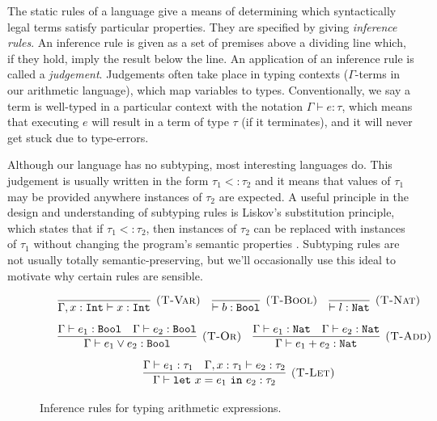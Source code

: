 The static rules of a language give a means of determining which syntactically legal terms satisfy particular properties. They are specified by giving \textit{inference rules}. An inference rule is given as a set of premises above a dividing line which, if they hold, imply the result below the line. An application of an inference rule is called a \textit{judgement}. Judgements often take place in typing contexts ($\Gamma$-terms in our arithmetic language), which map variables to types. Conventionally, we say a term is well-typed in a particular context with the notation $\Gamma \vdash e: \tau$, which means that executing $e$ will result in a term of type $\tau$ (if it terminates), and it will never get stuck due to type-errors.

Although our language has no subtyping, most interesting languages do. This judgement is usually written in the form $\tau_1 <: \tau_2$ and it means that values of $\tau_1$ may be provided anywhere instances of $\tau_2$ are expected. A useful principle in the design and understanding of subtyping rules is Liskov's substitution principle, which states that if $\tau_1 <: \tau_2$, then instances of $\tau_2$ can be replaced with instances of $\tau_1$ without changing the program's semantic properties \cite{liskov87}. Subtyping rules are not usually totally semantic-preserving, but we'll occasionally use this ideal to motivate why certain rules are sensible.\\


\begin{figure}[h]

\noindent
{}

\[
\begin{array}{c}

\infer[\textsc{(T-Var)}]
	{\Gamma, x: \kwa{Int} \vdash x: \kwa{Int}}
	{}
~~~
\infer[\textsc{(T-Bool)}]
	{\vdash b : \Bool}
	{}
	~~~
\infer[\textsc{(T-Nat)}]
	{\vdash l : \Nat}
	{}\\[2ex]

	~~~
\infer[\textsc{(T-Or)}]
	{\Gamma \vdash e_1 \lor e_2 : \Bool}
	{\Gamma \vdash e_1: \Bool & \Gamma \vdash e_2: \Bool}
	~~~
\infer[\textsc{(T-Add)}]
	{\Gamma \vdash e_1 + e_2 : \Nat}
	{\Gamma \vdash e_1: \Nat & \Gamma \vdash e_2: \Nat} \\[2ex]
	
\infer[\textsc{(T-Let)}]
	{\Gamma \vdash \letxpr{x}{e_1}{e_2} : \tau_2}
	{\Gamma \vdash e_1: \tau_1 & \Gamma, x: \tau_1 \vdash e_2: \tau_2}
	
	
\end{array}
\]

\vspace{-7pt}
\caption{Inference rules for typing arithmetic expressions.}
\label{A sample. }
\end{figure}

